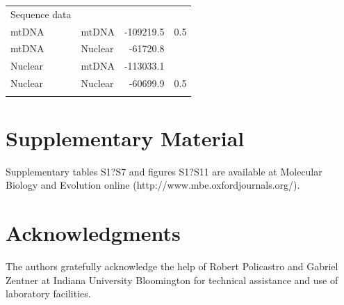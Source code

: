 \documentclass[nogrid]{MBE}%
\begin{document}
\begin{table}[!t]%
{\begin{tabular*}{\columnwidth}{@{\extracolsep{\fill}}lld{6,0}d{6,0}@{}}\toprule Sequence data &
 &  &  \\\colrule mtDNA& mtDNA& -109219.5& 0.5 \\
[0.1pt]
mtDNA& Nuclear& -61720.8&  \\
Nuclear& mtDNA& -113033.1&  \\
Nuclear& Nuclear& -60699.9& 0.5 \\\botrule
\end{tabular*}}
{}
\end{table}

%
\section{Supplementary Material}
Supplementary tables S1?S7 and figures S1?S11 are available  at Molecular Biology and Evolution
online (http://www.mbe.oxfordjournals.org/).

\section{Acknowledgments}

The authors gratefully acknowledge the help of Robert Policastro and Gabriel Zentner at Indiana University Bloomington for technical assistance and use of laboratory facilities.


\end{document}
